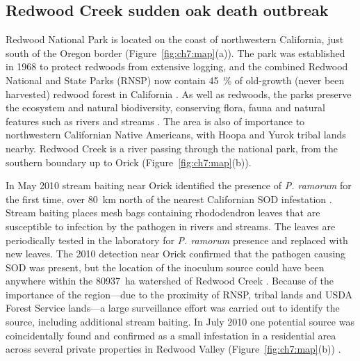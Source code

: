 \subsection{Redwood Creek sudden oak death outbreak}

Redwood National Park is located on the coast of northwestern California, just south of the Oregon border (Figure~\ref{fig:ch7:map}(a)). The park was established in 1968 to protect redwoods from extensive logging, and the combined Redwood National and State Parks (RNSP) now contain \SI{45}{\percent} of old-growth (never been harvested) redwood forest in California \citep{rnsp_website}. As well as redwoods, the parks preserve the ecosystem and natural biodiversity, conserving flora, fauna and natural features such as rivers and streams \citep{rnsp_website}. The area is also of importance to northwestern Californian Native Americans, with Hoopa and Yurok tribal lands nearby. Redwood Creek is a river passing through the national park, from the southern boundary up to Orick (Figure~\ref{fig:ch7:map}(b)).

In May 2010 stream baiting near Orick identified the presence of \emph{P. ramorum} for the first time, over \SI{80}{\km} north of the nearest Californian SOD infestation \citep{valachovic_novel_2013}. Stream baiting places mesh bags containing rhododendron leaves that are susceptible to infection by the pathogen in rivers and streams. The leaves are periodically tested in the laboratory for \emph{P. ramorum} presence and replaced with new leaves. The 2010 detection near Orick confirmed that the pathogen causing SOD was present, but the location of the inoculum source could have been anywhere within the \SI{80937}{\hectare} watershed of Redwood Creek \citep{valachovic_novel_2013}. Because of the importance of the region---due to the proximity of RNSP, tribal lands and USDA Forest Service lands---a large surveillance effort was carried out to identify the source, including additional stream baiting. In July 2010 one potential source was coincidentally found and confirmed as a small infestation in a residential area across several private properties in Redwood Valley (Figure~\ref{fig:ch7:map}(b)) \citep{valachovic_novel_2013}.


